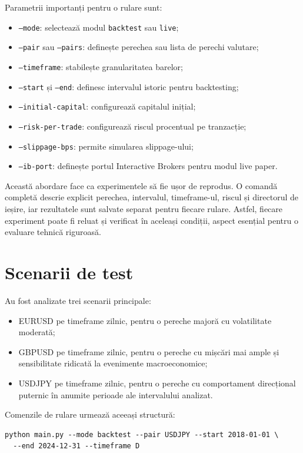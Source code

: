 Parametrii importanți pentru o rulare sunt:
\begin{itemize}
    \item \texttt{--mode}: selectează modul \texttt{backtest} sau \texttt{live};
    \item \texttt{--pair} sau \texttt{--pairs}: definește perechea sau lista de perechi valutare;
    \item \texttt{--timeframe}: stabilește granularitatea barelor;
    \item \texttt{--start} și \texttt{--end}: definesc intervalul istoric pentru backtesting;
    \item \texttt{--initial-capital}: configurează capitalul inițial;
    \item \texttt{--risk-per-trade}: configurează riscul procentual pe tranzacție;
    \item \texttt{--slippage-bps}: permite simularea slippage-ului;
    \item \texttt{--ib-port}: definește portul Interactive Brokers pentru modul live paper.
\end{itemize}

Această abordare face ca experimentele să fie ușor de reprodus. O comandă completă descrie explicit perechea, intervalul, timeframe-ul, riscul și directorul de ieșire, iar rezultatele sunt salvate separat pentru fiecare rulare. Astfel, fiecare experiment poate fi reluat și verificat în aceleași condiții, aspect esențial pentru o evaluare tehnică riguroasă.

\section{Scenarii de test}
\label{cap:cap4:scenarii}

Au fost analizate trei scenarii principale:
\begin{itemize}
    \item EURUSD pe timeframe zilnic, pentru o pereche majoră cu volatilitate moderată;
    \item GBPUSD pe timeframe zilnic, pentru o pereche cu mișcări mai ample și sensibilitate ridicată la evenimente macroeconomice;
    \item USDJPY pe timeframe zilnic, pentru o pereche cu comportament direcțional puternic în anumite perioade ale intervalului analizat.
\end{itemize}

Comenzile de rulare urmează aceeași structură:

\begin{code}
\begin{verbatim}
python main.py --mode backtest --pair USDJPY --start 2018-01-01 \
  --end 2024-12-31 --timeframe D
\end{verbatim}
\caption{Exemplu de rulare experimentală}
\label{code:test_run}
\end{code}

